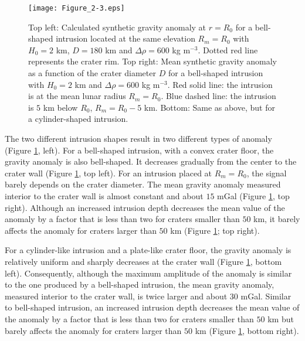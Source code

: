 \begin{figure}[h!]
  \graphicspath{ {/Users/thorey/Documents/These/Projet/FFC/Gravi_GRAIL/Article/Papier/Proof/} }
  \begin{center}
    \texttt{[image: Figure\_2-3.eps]}
    \caption{Top left: Calculated synthetic gravity anomaly at $r=R_0$
      for  a  bell-shaped  intrusion  located at  the  same  elevation
      $R_m=R_0$   with   $H_0   =   2$   km,  $D   =   180$   km   and
      $\Delta \rho = 600$ kg  m$^{-3}$. Dotted red line represents the
      crater  rim. Top  right:  Mean synthetic  gravity  anomaly as  a
      function of the crater diameter  $D$ for a bell-shaped intrusion
      with $H_0  = 2$  km and  $\Delta \rho =  600$ kg  m$^{-3}$.  Red
      solid  line:  the   intrusion  is  at  the   mean  lunar  radius
      $R_m=R_0$.  Blue dashed  line:  the intrusion  is  $5$ km  below
      $R_0$,  $R_m =  R_0-5$  km. Bottom:  Same as  above,  but for  a
      cylinder-shaped intrusion.}
    \label{C6-Figure2-3}
  \end{center}



\end{figure}

The two  different intrusion shapes  result in two different  types of
anomaly   (Figure  \ref{C6-Figure2-3},   left).   For   a  bell-shaped
intrusion, with  a convex  crater floor, the  gravity anomaly  is also
bell-shaped.  It  decreases gradually  from the  center to  the crater
wall (Figure  \ref{C6-Figure2-3}, top left).  For  an intrusion placed
at $R_m=R_0$, the  signal barely depends on the  crater diameter.  The
mean gravity  anomaly measured interior  to the crater wall  is almost
constant and  about $15$ mGal (Figure  \ref{C6-Figure2-3}, top right).
Although an increased intrusion depth  decreases the mean value of the
anomaly by  a factor that  is less than  two for craters  smaller than
$50$ km, it barely affects the anomaly for craters larger than $50$ km
(Figure \ref{C6-Figure2-3}; top right).

For  a cylinder-like  intrusion  and a  plate-like  crater floor,  the
gravity anomaly  is relatively  uniform and  sharply decreases  at the
crater  wall  (Figure  \ref{C6-Figure2-3}, bottom  left).   Consequently,
although the  maximum amplitude of the  anomaly is similar to  the one
produced  by  a  bell-shaped  intrusion,  the  mean  gravity  anomaly,
measured interior to  the crater wall, is twice larger  and about $30$
mGal. Similar  to bell-shaped intrusion, an  increased intrusion depth
decreases the mean value of the anomaly  by a factor that is less than
two for  craters smaller than $50$  km but barely affects  the anomaly
for  craters  larger  than  $50$ km  (Figure  \ref{C6-Figure2-3},  bottom
right).
  
